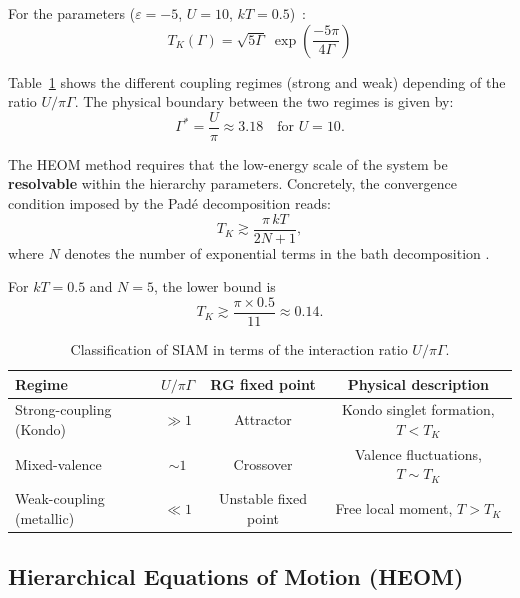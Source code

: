 \documentclass[preprint,1p]{elsarticle}
\begin{document}
For the parameters ($\varepsilon = -5$, $U = 10$,
$kT = 0.5$)~:
\begin{equation}
	T_K(\Gamma) = \sqrt{5\Gamma}\;
	\exp\!\left(\frac{-5\pi}{4\Gamma}\right)
	\label{eq:TK_num}
\end{equation}

Table~\ref{tab:regimes} shows the different coupling regimes (strong and weak) depending of the ratio $U/\pi\Gamma$. The physical boundary between the two regimes is given by:
\begin{equation}
	\Gamma^* = \frac{U}{\pi} \approx 3.18
	\quad \text{for } U = 10.
\end{equation}

The HEOM method \cite{Tanimura1989,Ishizaki2005,Huang2023heom} requires that the low-energy scale of the system be \textbf{resolvable} within the hierarchy parameters. Concretely, the convergence condition imposed by the Padé decomposition reads:
\begin{equation}
	T_K \gtrsim \frac{\pi\, kT}{2N+1},
	\label{eq:convergence}
\end{equation}
where \( N \) denotes the number of exponential terms in the bath decomposition \cite{Huang2023PRBHEOM}.

For \( kT = 0.5 \) and \( N = 5 \), the lower bound is
\begin{equation}
	T_K \gtrsim \frac{\pi \times 0.5}{11} \approx 0.14 .
\end{equation}


\begin{table}[t]
	\centering
	\caption{Classification of SIAM in terms of the interaction ratio $U/\pi\Gamma$.}
	\label{tab:regimes}
	\begin{tabular}{lccc}
		\toprule
		Regime & $U/\pi\Gamma$ & RG fixed point & Physical description \\
		\midrule
		Strong-coupling (Kondo) & $\gg 1$ & Attractor 
		& Kondo singlet formation, $T < T_K$ \\
		Mixed-valence & $\sim 1$ & Crossover 
		& Valence fluctuations, $T \sim T_K$ \\
		Weak-coupling (metallic) & $\ll 1$ & Unstable fixed point 
		& Free local moment, $T > T_K$ \\
		\bottomrule
	\end{tabular}
\end{table}

\subsection{Hierarchical Equations of Motion (HEOM)}
\end{document}
